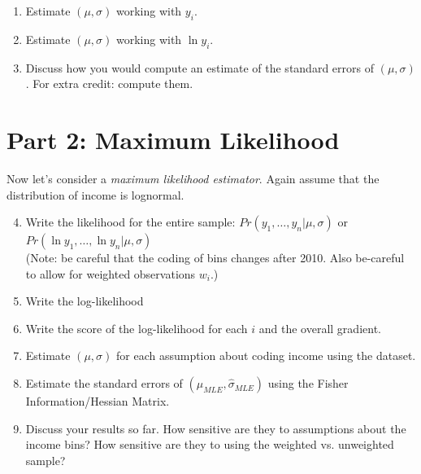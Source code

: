 \documentclass{article}
\begin{document}
\begin{enumerate}
\item Estimate $(\mu,\sigma)$ working with $y_i$.
\item Estimate $(\mu,\sigma)$ working with $\ln y_i$.
\item Discuss how you would compute an estimate of the standard errors of $(\mu,\sigma)$. For extra credit: compute them.
\end{enumerate}

\section*{\normalsize Part 2: Maximum Likelihood}

Now let's consider a \textit{maximum likelihood estimator}. Again assume that the distribution of income is lognormal. 
\begin{enumerate}
\setcounter{enumi}{3}
\item Write the likelihood for the entire sample:  $Pr(y_1,\ldots,y_n | \mu, \sigma)$ or $Pr(\ln y_1,\ldots, \ln y_n | \mu, \sigma)$ \\ (Note: be careful that the coding of bins changes after 2010. Also be-careful to allow for weighted observations $w_i$.)
\item Write the log-likelihood
\item Write the score of the log-likelihood for each $i$ and the overall gradient.
\item Estimate $(\mu,\sigma)$ for each assumption about coding income using the dataset.
\item Estimate the standard errors of $(\widehat{\mu}_{MLE},\widehat{\sigma}_{MLE})$ using the Fisher Information/Hessian Matrix.
\item Discuss your results so far. How sensitive are they to assumptions about the income bins? How sensitive are they to using the weighted vs. unweighted sample?
\end{enumerate}
\end{document}
